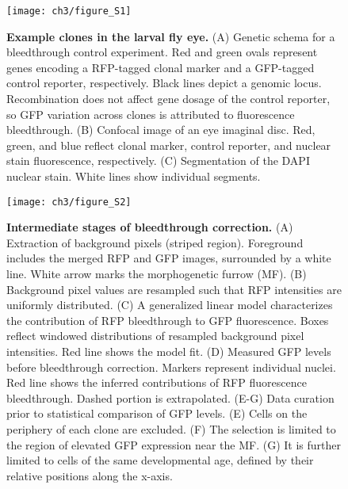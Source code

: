 \begin{figure}[h]
\texttt{[image: ch3/figure\_S1]}
\caption[Example clones in the larval fly eye.]{\textbf{Example clones in the larval fly eye.} (A) Genetic schema for a bleedthrough control experiment. Red and green ovals represent genes encoding a RFP-tagged clonal marker and a GFP-tagged control reporter, respectively. Black lines depict a genomic locus. Recombination does not affect gene dosage of the control reporter, so GFP variation across clones is attributed to fluorescence bleedthrough. (B) Confocal image of an eye imaginal disc. Red, green, and blue reflect clonal marker, control reporter, and nuclear stain fluorescence, respectively. (C) Segmentation of the DAPI nuclear stain. White lines show individual segments.}
\label{fig:ch3:figS1}
\end{figure}

\begin{figure}[h]
\texttt{[image: ch3/figure\_S2]}
\caption[Intermediate stages of bleedthrough correction.]{\textbf{Intermediate stages of bleedthrough correction.} (A) Extraction of background pixels (striped region). Foreground includes the merged RFP and GFP images, surrounded by a white line. White arrow marks the morphogenetic furrow (MF). (B) Background pixel values are resampled such that RFP intensities are uniformly distributed. (C) A generalized linear model characterizes the contribution of RFP bleedthrough to GFP fluorescence. Boxes reflect windowed distributions of resampled background pixel intensities. Red line shows the model fit. (D) Measured GFP levels before bleedthrough correction. Markers represent individual nuclei. Red line shows the inferred contributions of RFP fluorescence bleedthrough. Dashed portion is extrapolated. (E-G) Data curation prior to statistical comparison of GFP levels. (E) Cells on the periphery of each clone are excluded. (F) The selection is limited to the region of elevated GFP expression near the MF. (G) It is further limited to cells of the same developmental age, defined by their relative positions along the x-axis.}
\label{fig:ch3:figS2}
\end{figure}

